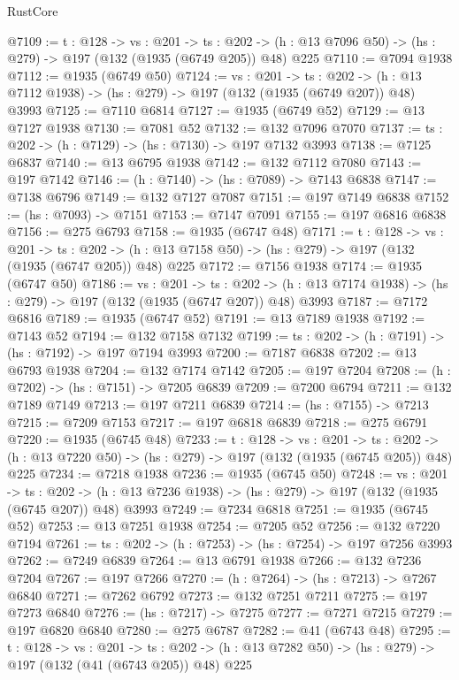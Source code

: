 \begin{lexlean}{RustCore}
\begin{coremodule}
@7109 := {t : @128} ->
  {vs : @201} ->
  {ts : @202} -> (h : @13 @7096 @50) -> (hs : @279) -> @197 (@132 (@1935 (@6749 @205)) @48) @225
@7110 := @7094 @1938
@7112 := @1935 (@6749 @50)
@7124 := {vs : @201} ->
  {ts : @202} -> (h : @13 @7112 @1938) -> (hs : @279) -> @197 (@132 (@1935 (@6749 @207)) @48) @3993
@7125 := @7110 @6814
@7127 := @1935 (@6749 @52)
@7129 := @13 @7127 @1938
@7130 := @7081 @52
@7132 := @132 @7096 @7070
@7137 := {ts : @202} -> (h : @7129) -> (hs : @7130) -> @197 @7132 @3993
@7138 := @7125 @6837
@7140 := @13 @6795 @1938
@7142 := @132 @7112 @7080
@7143 := @197 @7142
@7146 := (h : @7140) -> (hs : @7089) -> @7143 @6838
@7147 := @7138 @6796
@7149 := @132 @7127 @7087
@7151 := @197 @7149 @6838
@7152 := (hs : @7093) -> @7151
@7153 := @7147 @7091
@7155 := @197 @6816 @6838
@7156 := @275 @6793
@7158 := @1935 (@6747 @48)
@7171 := {t : @128} ->
  {vs : @201} ->
  {ts : @202} -> (h : @13 @7158 @50) -> (hs : @279) -> @197 (@132 (@1935 (@6747 @205)) @48) @225
@7172 := @7156 @1938
@7174 := @1935 (@6747 @50)
@7186 := {vs : @201} ->
  {ts : @202} -> (h : @13 @7174 @1938) -> (hs : @279) -> @197 (@132 (@1935 (@6747 @207)) @48) @3993
@7187 := @7172 @6816
@7189 := @1935 (@6747 @52)
@7191 := @13 @7189 @1938
@7192 := @7143 @52
@7194 := @132 @7158 @7132
@7199 := {ts : @202} -> (h : @7191) -> (hs : @7192) -> @197 @7194 @3993
@7200 := @7187 @6838
@7202 := @13 @6793 @1938
@7204 := @132 @7174 @7142
@7205 := @197 @7204
@7208 := (h : @7202) -> (hs : @7151) -> @7205 @6839
@7209 := @7200 @6794
@7211 := @132 @7189 @7149
@7213 := @197 @7211 @6839
@7214 := (hs : @7155) -> @7213
@7215 := @7209 @7153
@7217 := @197 @6818 @6839
@7218 := @275 @6791
@7220 := @1935 (@6745 @48)
@7233 := {t : @128} ->
  {vs : @201} ->
  {ts : @202} -> (h : @13 @7220 @50) -> (hs : @279) -> @197 (@132 (@1935 (@6745 @205)) @48) @225
@7234 := @7218 @1938
@7236 := @1935 (@6745 @50)
@7248 := {vs : @201} ->
  {ts : @202} -> (h : @13 @7236 @1938) -> (hs : @279) -> @197 (@132 (@1935 (@6745 @207)) @48) @3993
@7249 := @7234 @6818
@7251 := @1935 (@6745 @52)
@7253 := @13 @7251 @1938
@7254 := @7205 @52
@7256 := @132 @7220 @7194
@7261 := {ts : @202} -> (h : @7253) -> (hs : @7254) -> @197 @7256 @3993
@7262 := @7249 @6839
@7264 := @13 @6791 @1938
@7266 := @132 @7236 @7204
@7267 := @197 @7266
@7270 := (h : @7264) -> (hs : @7213) -> @7267 @6840
@7271 := @7262 @6792
@7273 := @132 @7251 @7211
@7275 := @197 @7273 @6840
@7276 := (hs : @7217) -> @7275
@7277 := @7271 @7215
@7279 := @197 @6820 @6840
@7280 := @275 @6787
@7282 := @41 (@6743 @48)
@7295 := {t : @128} ->
  {vs : @201} ->
  {ts : @202} -> (h : @13 @7282 @50) -> (hs : @279) -> @197 (@132 (@41 (@6743 @205)) @48) @225

\end{coremodule}
\end{lexlean}
